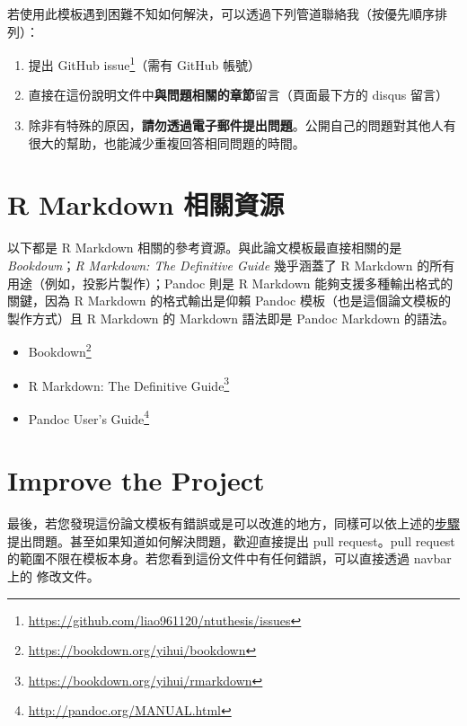 \documentclass[oneside]{book}
\renewcommand{\href}[2]{#2\footnote{\url{#1}}}
\providecommand{\tightlist}{%
  \setlength{\itemsep}{0pt}\setlength{\parskip}{0pt}}
\renewcommand{\appendixname}{附錄}
\theoremstyle{definition}
\theoremstyle{definition}
\theoremstyle{definition}
\theoremstyle{remark}
\begin{document}
若使用此模板遇到困難不知如何解決，可以透過下列管道聯絡我（按優先順序排列）：

\begin{enumerate}
\def\labelenumi{\arabic{enumi}.}
\tightlist
\item
  提出 \href{https://github.com/liao961120/ntuthesis/issues}{GitHub
  issue}（需有 GitHub 帳號）
\item
  直接在這份說明文件中\textbf{與問題相關的章節}留言（頁面最下方的 disqus
  留言）
\item
  除非有特殊的原因，\textbf{請勿透過電子郵件提出問題}。公開自己的問題對其他人有很大的幫助，也能減少重複回答相同問題的時間。
\end{enumerate}

\section*{R Markdown 相關資源}\label{rmd-resources}

以下都是 R Markdown 相關的參考資源。與此論文模板最直接相關的是
\emph{Bookdown}；\emph{R Markdown: The Definitive Guide} 幾乎涵蓋了 R
Markdown 的所有用途（例如，投影片製作）；Pandoc 則是 R Markdown
能夠支援多種輸出格式的關鍵，因為 R Markdown 的格式輸出是仰賴 Pandoc
模板（也是這個論文模板的製作方式）且 R Markdown 的 Markdown 語法即是
Pandoc Markdown 的語法。

\begin{itemize}
\item
  \href{https://bookdown.org/yihui/bookdown}{Bookdown}
\item
  \href{https://bookdown.org/yihui/rmarkdown}{R Markdown: The Definitive
  Guide}
\item
  \href{http://pandoc.org/MANUAL.html}{Pandoc User's Guide}
\end{itemize}

\section*{Improve the Project}\label{improve-the-project}

最後，若您發現這份論文模板有錯誤或是可以改進的地方，同樣可以依上述的\protect\hyperlink{issue}{步驟}提出問題。甚至如果知道如何解決問題，歡迎直接提出
pull request。pull request
的範圍不限在模板本身。若您看到這份文件中有任何錯誤，可以直接透過 navbar
上的 修改文件。

\appendix \addcontentsline{toc}{chapter}{\appendixname}
\end{document}
